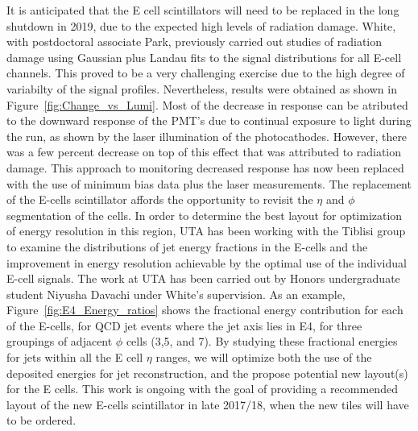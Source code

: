 It is anticipated that the E cell scintillators will need to be replaced in the long 
shutdown in 2019, due to the expected high levels of radiation damage. White, with postdoctoral
associate Park, previously carried out studies of radiation damage using Gaussian plus
Landau fits to the signal distributions for all E-cell channels. This proved to be a very
challenging exercise due to the high degree of variabilty of the signal profiles.
Nevertheless, results were obtained as shown in Figure~\ref{fig:Change_vs_Lumi}. Most of the
decrease in response can be atributed to the downward response of the PMT's due to continual 
exposure to light during the run, as shown by the laser illumination of the photocathodes. 
However, there was a few percent decrease on top of this effect that was attributed to radiation 
damage. This approach to monitoring decreased response has now been replaced with the use of 
minimum bias data plus the laser measurements.
The replacement of the E-cells scintillator affords the opportunity to revisit the $\eta$ and $\phi$ 
segmentation of the cells. In order to determine the best layout for optimization of energy 
resolution in this region, UTA has been working with the Tiblisi group to examine the distributions
of jet energy fractions in the E-cells and the improvement in energy resolution achievable by the
optimal use of the individual E-cell signals. The work at UTA has been carried out by Honors
undergraduate student Niyusha Davachi under White's supervision. As an example, Figure~\ref{fig:E4_Energy_ratios} 
shows the fractional energy contribution for each of the E-cells, for QCD jet events where the jet axis lies in E4,
for three groupings of adjacent $\phi$ cells (3,5, and 7). By studying these fractional energies for jets within all 
the E cell $\eta$ ranges, we will optimize both the use of the deposited energies for jet reconstruction, 
and the propose potential new layout(s) for the E cells. This work is ongoing with the
goal of providing a recommended layout of the new E-cells scintillator in late 2017/18, when the new tiles will 
have to be ordered. 

